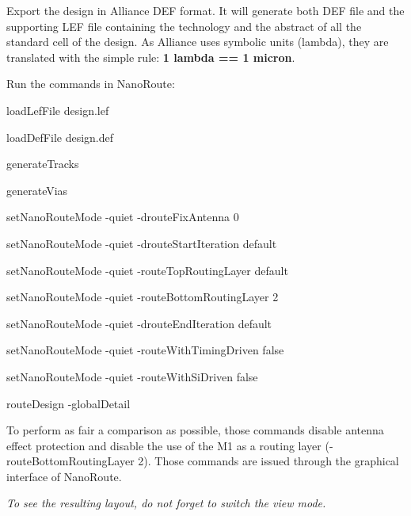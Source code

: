 \begin{DoxyItemize}
\item Export the design in Alliance {\ttfamily D\-E\-F} format. It will generate both {\ttfamily D\-E\-F} file and the supporting {\ttfamily L\-E\-F} file containing the technology and the abstract of all the standard cell of the design. As Alliance uses symbolic units (lambda), they are translated with the simple rule\-: {\bfseries 1 lambda == 1 micron}.
\item Run the commands in Nano\-Route\-:
\begin{DoxyItemize}
\item {\ttfamily load\-Lef\-File design.\-lef}
\item {\ttfamily load\-Def\-File design.\-def}
\item {\ttfamily generate\-Tracks}
\item {\ttfamily generate\-Vias}
\item {\ttfamily set\-Nano\-Route\-Mode -\/quiet -\/droute\-Fix\-Antenna 0}
\item {\ttfamily set\-Nano\-Route\-Mode -\/quiet -\/droute\-Start\-Iteration default}
\item {\ttfamily set\-Nano\-Route\-Mode -\/quiet -\/route\-Top\-Routing\-Layer default}
\item {\ttfamily set\-Nano\-Route\-Mode -\/quiet -\/route\-Bottom\-Routing\-Layer 2}
\item {\ttfamily set\-Nano\-Route\-Mode -\/quiet -\/droute\-End\-Iteration default}
\item {\ttfamily set\-Nano\-Route\-Mode -\/quiet -\/route\-With\-Timing\-Driven false}
\item {\ttfamily set\-Nano\-Route\-Mode -\/quiet -\/route\-With\-Si\-Driven false}
\item {\ttfamily route\-Design -\/global\-Detail}
\end{DoxyItemize}
\item To perform as fair a comparison as possible, those commands disable antenna effect protection and disable the use of the {\ttfamily M1} as a routing layer ({\ttfamily -\/route\-Bottom\-Routing\-Layer 2}). Those commands are issued through the graphical interface of Nano\-Route.
\end{DoxyItemize}

{\itshape To see the resulting layout, do not forget to switch the view mode.} 